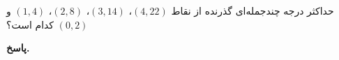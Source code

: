 حداکثر درجه چندجمله‌ای گذرنده از نقاط
\((4,22)\)،
\((3,14)\)،
\((2,8)\)،
\((1,4)\)
و
\((0,2)\)
کدام است؟
\vspace*{-.3cm}

\begin{answer}

	\textbf{پاسخ.}
	
\end{answer}
